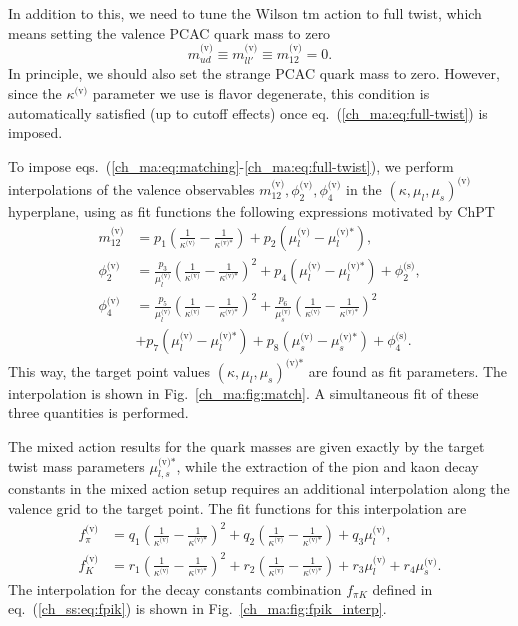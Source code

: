 In addition to this, we need to tune the Wilson tm action to full twist, which means setting the valence PCAC quark mass to zero
\begin{equation}
\label{ch_ma:eq:full-twist}
m_{ud}^{\textrm{(v)}}\equiv m_{ll'}^{\textrm{(v)}}\equiv m_{12}^{\textrm{(v)}}=0.
\end{equation}
In principle, we should also set the strange PCAC quark mass to zero. However, since the $\kappa^{\textrm{(v)}}$ parameter we use is flavor degenerate, this condition is automatically satisfied (up to cutoff effects) once eq.~(\ref{ch_ma:eq:full-twist}) is imposed.

To impose eqs.~(\ref{ch_ma:eq:matching}-\ref{ch_ma:eq:full-twist}), we perform interpolations of the valence observables $m_{12}^{\textrm{(v)}},\phi_2^{\textrm{(v)}},\phi_4^{\textrm{(v)}}$ in the $\left(\kappa,\mu_l,\mu_s\right)^{\textrm{(v)}}$ hyperplane, using as fit functions the following expressions motivated by ChPT
\begin{align}
m_{12}^{\textrm{(v)}}&=p_1\left(\frac{1}{\kappa^{\textrm{(v)}}}-\frac{1}{\kappa^{\textrm{(v)*}}}\right)+p_2\left(\mu_l^{\textrm{(v)}}-\mu_l^{\textrm{(v)*}}\right),\\
\phi_2^{\textrm{(v)}}&=\frac{p_3}{\mu_l^{\textrm{(v)}}}\left(\frac{1}{\kappa^{\textrm{(v)}}}-\frac{1}{\kappa^{\textrm{(v)*}}}\right)^2+p_4\left(\mu_l^{\textrm{(v)}}-\mu_l^{\textrm{(v)*}}\right)+\phi_2^{\textrm{(s)}},\\
\phi_4^{\textrm{(v)}}&=\frac{p_5}{\mu_l^{\textrm{(v)}}}\left(\frac{1}{\kappa^{\textrm{(v)}}}-\frac{1}{\kappa^{\textrm{(v)*}}}\right)^2+\frac{p_6}{\mu_s^{\textrm{(v)}}}\left(\frac{1}{\kappa^{\textrm{(v)}}}-\frac{1}{\kappa^{\textrm{(v)*}}}\right)^2 \\
&+p_7\left(\mu_l^{\textrm{(v)}}-\mu_l^{\textrm{(v)*}}\right)+p_8\left(\mu_s^{\textrm{(v)}}-\mu_s^{\textrm{(v)*}}\right)+\phi_4^{\textrm{(s)}}.
\end{align}
This way, the target point values $\left(\kappa,\mu_l,\mu_s\right)^{\textrm{(v)*}}$ are found as fit parameters. The interpolation is shown in Fig.~\ref{ch_ma:fig:match}. A simultaneous fit of these three quantities is performed.

The mixed action results for the quark masses are given exactly by the target twist mass parameters $\mu_{l,s}^{\textrm{(v)*}}$, while the extraction of the pion and kaon decay constants in the mixed action setup requires an additional interpolation along the valence grid to the target point. The fit functions for this interpolation are
\begin{align}
f_{\pi}^{\textrm{(v)}}&=q_1\left(\frac{1}{\kappa^{\textrm{(v)}}}-\frac{1}{\kappa^{\textrm{(v)*}}}\right)^2+q_2\left(\frac{1}{\kappa^{\textrm{(v)}}}-\frac{1}{\kappa^{\textrm{(v)*}}}\right)+q_3\mu_l^{\textrm{(v)}},\\
f_K^{\textrm{(v)}}&=r_1\left(\frac{1}{\kappa^{\textrm{(v)}}}-\frac{1}{\kappa^{\textrm{(v)*}}}\right)^2+r_2\left(\frac{1}{\kappa^{\textrm{(v)}}}-\frac{1}{\kappa^{\textrm{(v)*}}}\right)+r_3\mu_l^{\textrm{(v)}}+r_4\mu_s^{\textrm{(v)}}.
\end{align}
The interpolation for the decay constants combination $f_{\pi K}$ defined in eq.~(\ref{ch_ss:eq:fpik}) is shown in Fig.~\ref{ch_ma:fig:fpik_interp}.

